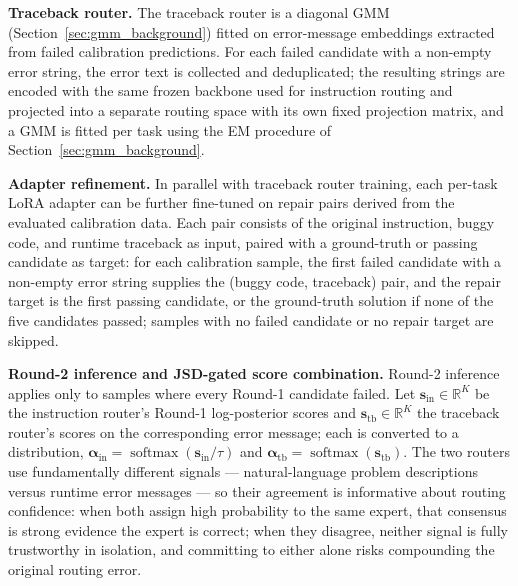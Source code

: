 \textbf{Traceback router.} The traceback router is a diagonal GMM (Section~\ref{sec:gmm_background}) fitted on error-message embeddings extracted from failed calibration predictions. For each failed candidate with a non-empty error string, the error text is collected and deduplicated; the resulting strings are encoded with the same frozen backbone used for instruction routing and projected into a separate routing space with its own fixed projection matrix, and a GMM is fitted per task using the EM procedure of Section~\ref{sec:gmm_background}.

\textbf{Adapter refinement.} In parallel with traceback router training, each per-task LoRA adapter can be further fine-tuned on repair pairs derived from the evaluated calibration data. Each pair consists of the original instruction, buggy code, and runtime traceback as input, paired with a ground-truth or passing candidate as target: for each calibration sample, the first failed candidate with a non-empty error string supplies the (buggy code, traceback) pair, and the repair target is the first passing candidate, or the ground-truth solution if none of the five candidates passed; samples with no failed candidate or no repair target are skipped.

\textbf{Round-2 inference and JSD-gated score combination.}
\label{sec:round2}
Round-2 inference applies only to samples where every Round-1 candidate failed. Let $\mathbf{s}_{\mathrm{in}}\in\mathbb{R}^K$ be the instruction router's Round-1 log-posterior scores and $\mathbf{s}_{\mathrm{tb}}\in\mathbb{R}^K$ the traceback router's scores on the corresponding error message; each is converted to a distribution, $\bm{\alpha}_{\mathrm{in}}=\operatorname{softmax}(\mathbf{s}_{\mathrm{in}}/\tau)$ and $\bm{\alpha}_{\mathrm{tb}}=\operatorname{softmax}(\mathbf{s}_{\mathrm{tb}})$. The two routers use fundamentally different signals --- natural-language problem descriptions versus runtime error messages --- so their agreement is informative about routing confidence: when both assign high probability to the same expert, that consensus is strong evidence the expert is correct; when they disagree, neither signal is fully trustworthy in isolation, and committing to either alone risks compounding the original routing error.

